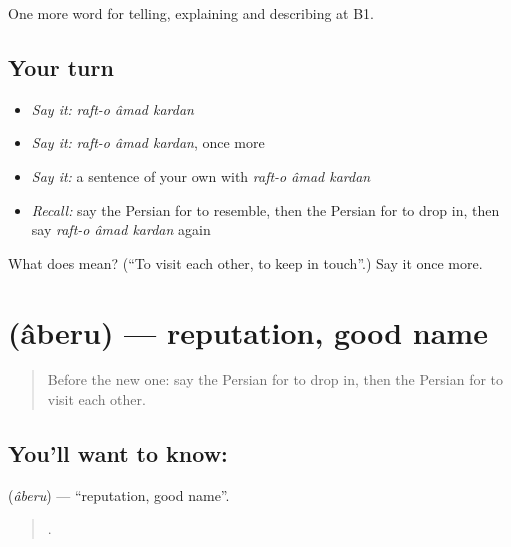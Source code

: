 \begin{grammarlens}[title={What you've built}]
One more word for telling, explaining and describing at B1.
\end{grammarlens}

\subsection*{Your turn}
\begin{itemize}
\raggedright
  \item \emph{Say it:} \emph{raft-o âmad kardan}
  \item \emph{Say it:} \emph{raft-o âmad kardan}, once more
  \item \emph{Say it:} a sentence of your own with \emph{raft-o âmad kardan}
  \item \emph{Recall:} say the Persian for to resemble, then the Persian for to drop in, then say \emph{raft-o âmad kardan} again
\end{itemize}

\begin{tcolorbox}[breakable,colback=teal!4,colframe=teal!35!black,title={Before you move on}]
What does     mean? (\textquotedblleft{}To visit each other, to keep in touch\textquotedblright{}.) Say it once more.
\end{tcolorbox}
\section[\texorpdfstring{\fa{آبرو} (âberu)}{آبرو (âberu)}]{ (âberu) — reputation, good name}

\label{lesson:FA-C506-aberu}



\begin{quote}
Before the new one: say the Persian for to drop in, then the Persian for to visit each other.
\end{quote}

\subsection*{You'll want to know: }
\textbf{} (\emph{âberu}) — \textquotedblleft{}reputation, good name\textquotedblright{}.

\begin{quote}
     .
\end{quote}

